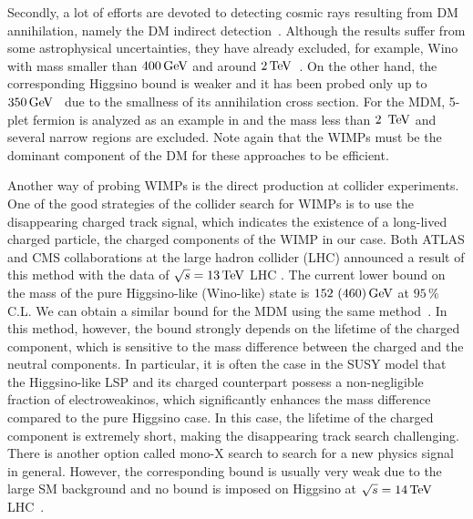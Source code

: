 \documentclass[12pt,twoside,book]{article}
\begin{document}
Secondly, a lot of efforts are devoted to detecting cosmic rays resulting from DM annihilation, namely the DM indirect detection~\cite{Fermi-LAT:2016uux, Ahnen:2016qkx, Abdallah:2016ygi, Gomez-Vargas:2013bea}.
Although the results suffer from some astrophysical uncertainties, they have already excluded, for example, Wino with mass smaller than $400\,{\rm GeV}$ and around $2\,{\rm TeV}$~\cite{Bhattacherjee:2014dya}.
On the other hand, the corresponding Higgsino bound is weaker and it has been probed only up to $350\,{\rm GeV}$~\cite{Krall:2017xij} due to the smallness of its annihilation cross section.
For the MDM, 5-plet fermion is analyzed as an example in \cite{Abdalla:2018mve} and the mass less than $2\,~{\rm TeV}$ and several narrow regions are excluded.
Note again that the WIMPs must be the dominant component of the DM for these approaches to be efficient.

Another way of probing WIMPs is the direct production at collider experiments.
One of the good strategies of the collider search for WIMPs is to use the disappearing charged track signal, which indicates the existence of a long-lived charged particle, the charged components of the WIMP in our case.
Both ATLAS and CMS collaborations at the large hadron collider (LHC) announced a result of this method with the data of $\sqrt{s} = 13\,{\rm TeV}$ LHC \cite{Aaboud:2017mpt, ATL-PHYS-PUB-2017-019, Sirunyan:2018ldc}.
The current lower bound on the mass of the pure Higgsino-like (Wino-like) state is $152~(460)\,{\rm GeV}$ at $95\,\%$ C.L.
We can obtain a similar bound for the MDM using the same method~\cite{Ostdiek:2015aga}.
In this method, however, the bound strongly depends on the lifetime of the charged component, which is sensitive to the mass difference between the charged and the neutral components.
In particular, it is often the case in the SUSY model that the Higgsino-like LSP and its charged counterpart possess a non-negligible fraction of electroweakinos, which significantly enhances the mass difference compared to the pure Higgsino case.
In this case, the lifetime of the charged component is extremely short, making the disappearing track search challenging.
There is another option called mono-X search to search for a new physics signal in general.
However, the corresponding bound is usually very weak due to the large SM background and no bound is imposed on Higgsino at $\sqrt{s} = 14\,{\rm TeV}$ LHC~\cite{Baer:2014cua}.
\end{document}
